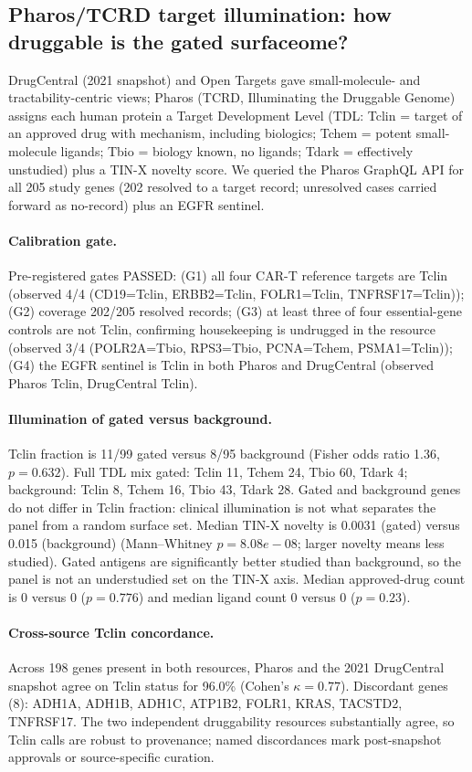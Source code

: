\subsection{Pharos/TCRD target illumination: how druggable is the gated surfaceome?}
\label{sec:pharos}
DrugCentral (2021 snapshot) and Open Targets gave small-molecule- and
tractability-centric views; Pharos (TCRD, Illuminating the Druggable Genome)
assigns each human protein a Target Development Level (TDL: Tclin = target of
an approved drug with mechanism, including biologics; Tchem = potent
small-molecule ligands; Tbio = biology known, no ligands; Tdark = effectively
unstudied) plus a TIN-X novelty score. We queried the Pharos GraphQL API for
all 205 study genes (202 resolved to a target record; unresolved cases
carried forward as no-record) plus an EGFR sentinel.

\paragraph{Calibration gate.} Pre-registered gates PASSED: (G1) all four CAR-T
reference targets are Tclin (observed 4/4 (CD19=Tclin, ERBB2=Tclin, FOLR1=Tclin, TNFRSF17=Tclin)); (G2) coverage 202/205
resolved records; (G3) at least three of four essential-gene controls are not
Tclin, confirming housekeeping is undrugged in the resource (observed
3/4 (POLR2A=Tbio, RPS3=Tbio, PCNA=Tchem, PSMA1=Tclin)); (G4) the EGFR sentinel is Tclin in both Pharos and DrugCentral
(observed Pharos Tclin, DrugCentral Tclin).

\paragraph{Illumination of gated versus background.} Tclin fraction is
11/99 gated versus 8/95 background (Fisher odds ratio
1.36, $p=0.632$). Full TDL mix gated: Tclin 11, Tchem 24, Tbio 60, Tdark 4; background: Tclin 8, Tchem 16, Tbio 43, Tdark 28. Gated and background genes do not differ in Tclin fraction: clinical illumination is not what separates the panel from a random surface set.
Median TIN-X novelty is 0.0031 (gated) versus 0.015 (background)
(Mann--Whitney $p=8.08e-08$; larger novelty means less studied). Gated antigens are significantly better studied than background, so the panel is not an understudied set on the TIN-X axis.
Median approved-drug count is 0 versus 0 ($p=0.776$) and median
ligand count 0 versus 0 ($p=0.23$).

\paragraph{Cross-source Tclin concordance.} Across 198 genes present in
both resources, Pharos and the 2021 DrugCentral snapshot agree on Tclin status
for 96.0\% (Cohen's $\kappa=0.77$). Discordant genes (8):
ADH1A, ADH1B, ADH1C, ATP1B2, FOLR1, KRAS, TACSTD2, TNFRSF17. The two independent druggability resources substantially agree, so Tclin calls are robust to provenance; named discordances mark post-snapshot approvals or source-specific curation.

